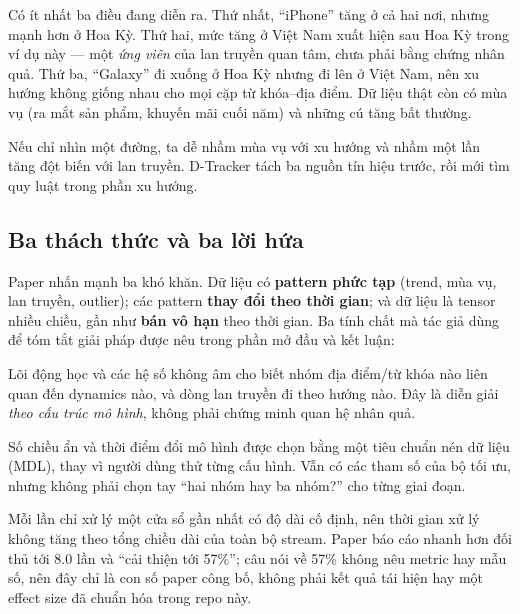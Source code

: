 Có ít nhất ba điều đang diễn ra. Thứ nhất, ``iPhone'' tăng ở cả hai nơi, nhưng mạnh hơn ở Hoa Kỳ.
Thứ hai, mức tăng ở Việt Nam xuất hiện sau Hoa Kỳ trong ví dụ này --- một \emph{ứng viên} của
lan truyền quan tâm, chưa phải bằng chứng nhân quả. Thứ ba, ``Galaxy'' đi xuống ở Hoa Kỳ nhưng
đi lên ở Việt Nam, nên xu hướng không giống nhau cho mọi cặp từ khóa--địa điểm. Dữ liệu thật
còn có mùa vụ (ra mắt sản phẩm, khuyến mãi cuối năm) và những cú tăng bất thường.

\begin{plainwords}
Nếu chỉ nhìn một đường, ta dễ nhầm mùa vụ với xu hướng và nhầm một lần tăng đột biến với lan
truyền. D-Tracker tách ba nguồn tín hiệu trước, rồi mới tìm quy luật trong phần xu hướng.
\end{plainwords}

\subsection{Ba thách thức và ba lời hứa}

Paper nhấn mạnh ba khó khăn. Dữ liệu có \textbf{pattern phức tạp} (trend, mùa vụ, lan truyền,
outlier); các pattern \textbf{thay đổi theo thời gian}; và dữ liệu là tensor nhiều chiều,
gần như \textbf{bán vô hạn} theo thời gian. Ba tính chất mà tác giả dùng để tóm tắt giải pháp
được nêu trong phần mở đầu và kết luận:

\begin{description}[leftmargin=1.8em,style=nextline]
  \item[Interpretable --- diễn giải được.] Lõi động học và các hệ số không âm cho biết nhóm
  địa điểm/từ khóa nào liên quan đến dynamics nào, và dòng lan truyền đi theo hướng nào.
  Đây là diễn giải \emph{theo cấu trúc mô hình}, không phải chứng minh quan hệ nhân quả.
  \item[Automatic --- tự động.] Số chiều ẩn và thời điểm đổi mô hình được chọn bằng một tiêu
  chuẩn nén dữ liệu (MDL), thay vì người dùng thử từng cấu hình. Vẫn có các tham số của bộ tối ưu,
  nhưng không phải chọn tay ``hai nhóm hay ba nhóm?'' cho từng giai đoạn.
  \item[Scalable --- mở rộng được.] Mỗi lần chỉ xử lý một cửa sổ gần nhất có độ dài cố định,
  nên thời gian xử lý không tăng theo tổng chiều dài của toàn bộ stream. Paper báo cáo nhanh hơn
  đối thủ tới 8.0 lần và ``cải thiện tới 57\%''; câu nói về 57\% không nêu metric hay mẫu số, nên
  đây chỉ là con số paper công bố, không phải kết quả tái hiện hay một effect size đã chuẩn hóa
  trong repo này.
\end{description}

